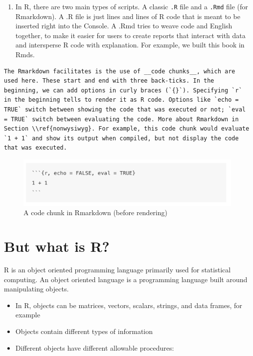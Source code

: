 \documentclass[]{book}
\providecommand{\tightlist}{%
  \setlength{\itemsep}{0pt}\setlength{\parskip}{0pt}}
\theoremstyle{definition}
\theoremstyle{definition}
\theoremstyle{definition}
\theoremstyle{remark}
\begin{document}
\begin{enumerate}
\def\labelenumi{\arabic{enumi}.}
\setcounter{enumi}{4}
\tightlist
\item
  In R, there are two main types of scripts. A classic \texttt{.R} file and a \texttt{.Rmd} file (for Rmarkdown). A .R file is just lines and lines of R code that is meant to be inserted right into the Console. A .Rmd tries to weave code and English together, to make it easier for users to create reports that interact with data and intersperse R code with explanation. For example, we built this book in Rmds.
\end{enumerate}

\begin{verbatim}
The Rmarkdown facilitates is the use of __code chunks__, which are used here. These start and end with three back-ticks. In the beginning, we can add options in curly braces (`{}`). Specifying `r` in the beginning tells to render it as R code. Options like `echo = TRUE` switch between showing the code that was executed or not; `eval = TRUE` switch between evaluating the code. More about Rmarkdown in Section \\ref{nonwysiwyg}. For example, this code chunk would evaluate `1 + 1` and show its output when compiled, but not display the code that was executed.
\end{verbatim}

\begin{figure}
\centering
\includegraphics{images/11_4_codechunk.png}
\caption{A code chunk in Rmarkdown (before rendering)}
\end{figure}

\hypertarget{but-what-is-r}{%
\section{But what is R?}\label{but-what-is-r}}

R is an object oriented programming language primarily used for statistical computing. An object oriented language is a programming language built around manipulating objects.

\begin{itemize}
\tightlist
\item
  In R, objects can be matrices, vectors, scalars, strings, and data frames, for example
\item
  Objects contain different types of information
\item
  Different objects have different allowable procedures:
\end{itemize}
\end{document}
